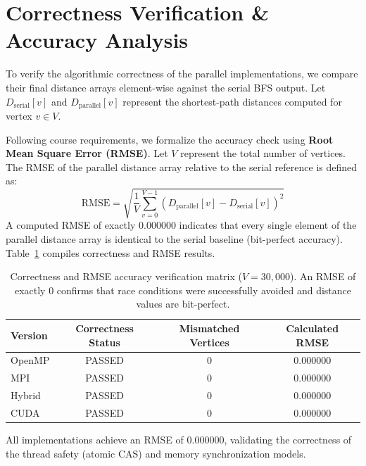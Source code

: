 \documentclass[12pt, a4paper]{article}
\begin{document}
\section{Correctness Verification \& Accuracy Analysis}
To verify the algorithmic correctness of the parallel implementations, we compare their final distance arrays element-wise against the serial BFS output. Let $D_{\text{serial}}[v]$ and $D_{\text{parallel}}[v]$ represent the shortest-path distances computed for vertex $v \in V$.

Following course requirements, we formalize the accuracy check using \textbf{Root Mean Square Error (RMSE)}. Let $V$ represent the total number of vertices. The RMSE of the parallel distance array relative to the serial reference is defined as:
\begin{equation}
\text{RMSE} = \sqrt{\frac{1}{V} \sum_{v=0}^{V-1} \left( D_{\text{parallel}}[v] - D_{\text{serial}}[v] \right)^2}
\end{equation}
A computed RMSE of exactly $0.000000$ indicates that every single element of the parallel distance array is identical to the serial baseline (bit-perfect accuracy). Table~\ref{tab:rmse} compiles correctness and RMSE results.

\begin{table}[H]
\centering
\begin{tabular}{@{}lccc@{}}
\toprule
\textbf{Version} & \textbf{Correctness Status} & \textbf{Mismatched Vertices} & \textbf{Calculated RMSE} \\
\midrule
OpenMP & PASSED & 0 & 0.000000 \\
MPI & PASSED & 0 & 0.000000 \\
Hybrid & PASSED & 0 & 0.000000 \\
CUDA & PASSED & 0 & 0.000000 \\
\bottomrule
\end{tabular}
\caption{Correctness and RMSE accuracy verification matrix ($V=30,000$). An RMSE of exactly 0 confirms that race conditions were successfully avoided and distance values are bit-perfect.}
\label{tab:rmse}
\end{table}
All implementations achieve an RMSE of $0.000000$, validating the correctness of the thread safety (atomic CAS) and memory synchronization models.

\end{document}
